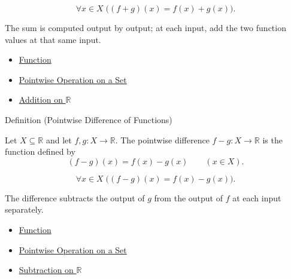 \begin{remark*}
\[
  \forall x\in X\;\bigl((f+g)(x)=f(x)+g(x)\bigr).
\]
\end{remark*}

\begin{remark*}[Interpretation]
The sum is computed output by output; at each input, add the two function
values at that same input.
\end{remark*}

\begin{dependencies}
\begin{itemize}
  \item \hyperref[def:function]{Function}
  \item \hyperref[def:pointwise-operation-on-set]{Pointwise Operation on a Set}
  \item \hyperref[def:addition-on-r]{Addition on $\mathbb{R}$}
\end{itemize}
\end{dependencies}

\begin{definitionbox}{Definition (Pointwise Difference of Functions)}
\begin{definition}
\label{def:pointwise-difference-of-functions}
Let $X\subseteq\mathbb{R}$ and let $f,g:X\to\mathbb{R}$.  The
pointwise difference $f-g:X\to\mathbb{R}$ is the function defined by
\[
  (f-g)(x)=f(x)-g(x)
  \qquad (x\in X).
\]
\end{definition}
\end{definitionbox}

\begin{remark*}
\[
  \forall x\in X\;\bigl((f-g)(x)=f(x)-g(x)\bigr).
\]
\end{remark*}

\begin{remark*}[Interpretation]
The difference subtracts the output of $g$ from the output of $f$ at each
input separately.
\end{remark*}

\begin{dependencies}
\begin{itemize}
  \item \hyperref[def:function]{Function}
  \item \hyperref[def:pointwise-operation-on-set]{Pointwise Operation on a Set}
  \item \hyperref[def:subtraction-on-r]{Subtraction on $\mathbb{R}$}
\end{itemize}
\end{dependencies}

